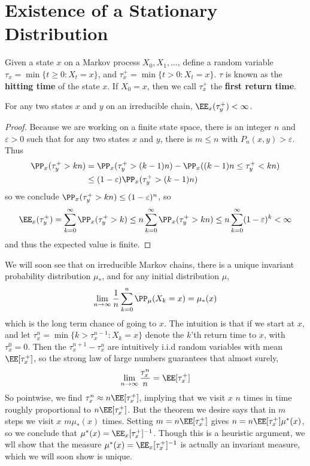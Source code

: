 \section{Existence of a Stationary Distribution}

Given a state $x$ on a Markov process $X_0, X_1, \dots$, define a random variable $\tau_x = \min \{ t \geq 0: X_t = x \}$, and $\tau_x^+ = \min \{ t > 0 : X_t = x \}$. $\tau$ is known as the {\bf hitting time} of the state $x$. If $X_0 = x$, then we call $\tau_x^+$ the {\bf first return time}.

\begin{lemma}
    For any two states $x$ and $y$ on an irreducible chain, $\EE_x(\tau_y^+) < \infty$.
\end{lemma}
\begin{proof}
    Because we are working on a finite state space, there is an integer $n$ and $\varepsilon > 0$ such that for any two states $x$ and $y$, there is $m \leq n$ with $P_n(x,y) > \varepsilon$. Thus
    \begin{align*}
        \PP_x(\tau_y^+ > kn) &= \PP_x(\tau_y^+ > (k-1)n) - \PP_x((k-1)n \leq \tau_y^+ < kn)\\
        &\leq (1 - \varepsilon) \PP_x(\tau_y^+ > (k-1)n)
    \end{align*}
    so we conclude $\PP_x(\tau_y^+ > kn) \leq (1 - \varepsilon)^n$, so
    \[ \EE_x(\tau_y^+) = \sum_{k = 0}^\infty \PP_x(\tau_y^+ > k) \leq n \sum_{k = 0}^\infty \PP_x(\tau_y^+ > kn) \leq n \sum_{k = 0}^\infty (1 - \varepsilon)^k < \infty \]
    and thus the expected value is finite.
\end{proof}

We will soon see that on irreducible Markov chains, there is a unique invariant probability distribution $\mu_*$, and for any initial distribution $\mu$,
%
\[ \lim_{n \to \infty} \frac{1}{n} \sum_{k = 0}^n \PP_\mu(X_k = x) = \mu_*(x) \]
%
which is the long term chance of going to $x$. The intuition is that if we start at $x$, and let $\tau_x^n = \min \{ k > \tau_x^{n-1} : X_k = x \}$ denote the $k$'th return time to $x$, with $\tau_x^0 = 0$. Then the $\tau_x^{n+1} - \tau_x^n$ are intuitively i.i.d random variables with mean $\EE[\tau_x^+]$, so the strong law of large numbers guarantees that almost surely,
%
\[ \lim_{n \to \infty} \frac{\tau_x^n}{n} = \EE[\tau_x^+] \]
%
So pointwise, we find $\tau_x^n \approx n \EE[\tau_x^+]$, implying that we visit $x$ $n$ times in time roughly proportional to $n \EE[\tau_x^+]$. But the theorem we desire says that in $m$ steps we visit $x$ $m \mu_*(x)$ times. Setting $m = n \EE[\tau_x^+]$ gives $n = n\EE[\tau_x^+]\mu^*(x)$, so we conclude that $\mu^*(x) = \EE_x[\tau_x^+]^{-1}$. Though this is a heuristic argument, we wll show that the measure $\mu^*(x) = \EE_x[\tau_x^+]^{-1}$ is actually an invariant measure, which we will soon show is unique.

